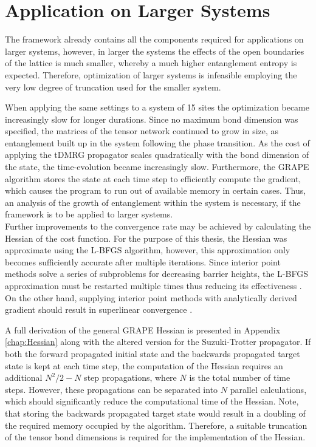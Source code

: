 \section{Application on Larger Systems} \label{sec:appLargeSystems}

The framework already contains all the components required for applications on larger systems, however, in larger the systems the effects of the open boundaries of the lattice is much smaller, whereby a much higher entanglement entropy is expected. Therefore, optimization of larger systems is infeasible employing the very low degree of truncation used for the smaller system. 

When applying the same settings to a system of 15 sites the optimization became increasingly slow for longer durations. Since no maximum bond dimension was specified, the matrices of the tensor network continued to grow in size, as entanglement built up in the system following the phase transition. As the cost of applying the tDMRG propagator scales quadratically with the bond dimension of the state, the time-evolution became increasingly slow. Furthermore, the GRAPE algorithm stores the state at each time step to efficiently compute the gradient, which causes the program to run out of available memory in certain cases. Thus, an analysis of the growth of entanglement within the system is necessary, if the framework is to be applied to larger systems.\\

Further improvements to the convergence rate may be achieved by calculating the Hessian of the cost function. For the purpose of this thesis, the Hessian was approximate using the L-BFGS algorithm, however, this approximation only becomes sufficiently accurate after multiple iterations. Since interior point methods solve a series of subproblems for decreasing barrier heights, the L-BFGS approximation must be restarted multiple times thus reducing its effectiveness \cite{Wachter2006}. On the other hand, supplying interior point methods with analytically derived gradient should result in superlinear convergence \cite{wright}.

A full derivation of the general GRAPE Hessian is presented in Appendix \ref{chap:Hessian} along with the altered version for the Suzuki-Trotter propagator. If both the forward propagated initial state and the backwards propagated target state is kept at each time step, the computation of the Hessian requires an additional $N^2 / 2 - N$ step propagations, where $N$ is the total number of time steps. However, these propagations can be separated into $N$ parallel calculations, which should significantly reduce the computational time of the Hessian. Note, that storing the backwards propagated target state would result in a doubling of the required memory occupied by the algorithm. Therefore, a suitable truncation of the tensor bond dimensions is required for the implementation of the Hessian.

